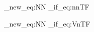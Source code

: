 \let\@degreeModifier\@empty
\newcommand{\degreeModifier}[1]{\def\@degreeModifier{#1}}

\let\@subjectArea\@empty
\newcommand{\subjectArea}[1]{\def\@subjectArea{#1}}

\let\@secondDegreeName\@empty
\newcommand{\secondDegreeName}[1]{\def\@secondDegreeName{#1}}
\let\@secondSubjectArea\@empty
\newcommand{\secondSubjectArea}[1]{\def\@secondSubjectArea{#1}}

\let\@presentationDateAndTimeISO\@empty
\newcommand{\presentationDateAndTimeISO}[1]{\def\@presentationDateAndTimeISO{#1}}
\let\@presentationLanguage\@empty
\newcommand{\presentationLanguage}[1]{\def\@presentationLanguage{#1}}
\let\@presentationRoom\@empty
\newcommand{\presentationRoom}[1]{\def\@presentationRoom{#1}}
\let\@presentationAddress\@empty
\newcommand{\presentationAddress}[1]{\def\@presentationAddress{#1}}
\let\@presentationCity\@empty
\newcommand{\presentationCity}[1]{\def\@presentationCity{#1}}

\let\@opponentsNames\@empty
\newcommand{\opponentsNames}[1]{\def\@opponentsNames{#1}}

\let\@nationalsubjectcategories\@empty
\newcommand{\nationalsubjectcategories}[1]{\def\@nationalsubjectcategories{#1}}

\let\@SDGs\@empty
\newcommand{\SDGs}[1]{\def\@SDGs{#1}}

\let\@EnglishKeywords\@empty
\newcommand{\EnglishKeywords}[1]{\def\@EnglishKeywords{#1}}

\let\@SwedishKeywords\@empty
\newcommand{\SwedishKeywords}[1]{\def\@SwedishKeywords{#1}}

\ExplSyntaxOn
\cs_new_eq:NN \strcompare \str_if_eq:nnTF

\cs_new_eq:NN \strcompareV \str_if_eq:VnTF
\ExplSyntaxOff



\newcommand{\InsertKeywords}[1]{
\strcompare{#1}{english}{\@EnglishKeywords}{}%
\strcompare{#1}{swedish}{\@SwedishKeywords}{}%
}

